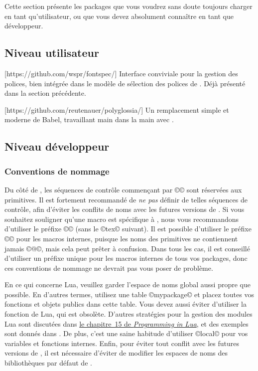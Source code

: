 \documentclass{lltxdoc}
\begin{document}
Cette section présente les packages que vous voudrez sans doute toujours
charger en tant qu'utilisateur, ou que vous devez absolument connaître
en tant que développeur.

\subsection{Niveau utilisateur}

[https://github.com/wspr/fontspec/]
Interface conviviale pour la gestion des polices, bien intégrée dans le modèle
de sélection des polices de \latex. Déjà présenté dans la section précédente.

[https://github.com/reutenauer/polyglossia/]
Un remplacement simple et moderne de Babel, travaillant main dans la main avec .

\subsection{Niveau développeur}

\subsubsection{Conventions de nommage}

Du côté de \tex, les séquences de contrôle commençant par ©\luatex© sont
réservées aux primitives. Il est fortement recommandé de \emph{ne pas} définir
de telles séquences de contrôle, afin d'éviter les conflits de noms avec
les futures versions de \luatex. Si vous souhaitez souligner qu'une macro est
spécifique à \luatex, nous vous recommandons d'utiliser le préfixe ©\lua©
(sans le ©tex© suivant). Il est possible d'utiliser le préfixe ©\luatex@©
pour les macros internes, puisque les noms des primitives ne contiennent
jamais ©@©, mais cela peut prêter à confusion.
Dans tous les cas, il est conseillé d'utiliser un préfixe unique pour
les macros internes de tous vos packages, donc ces conventions de nommage
ne devrait pas vous poser de problème.

En ce qui concerne Lua, veuillez garder l'espace de noms global aussi propre
que possible. En d'autres termes, utilisez une table ©mypackage© et placez
toutes vos fonctions et objets publics dans cette table. Vous devez aussi
éviter d'utiliser la fonction  de Lua, qui est obsolète.
D'autres stratégies pour la gestion des modules Lua sont discutées dans
\href{http://www.lua.org/pil/15.html}{le chapitre~15 de \emph{Programming in Lua}},
et des exemples sont donnés dans . De plus,
c'est une saine habitude d'utiliser ©local© pour vos variables et fonctions
internes. Enfin, pour éviter tout conflit avec les futures versions de \luatex,
il est nécessaire d'éviter de modifier les espaces de noms des bibliothèques
par défaut de \luatex.
\end{document}
